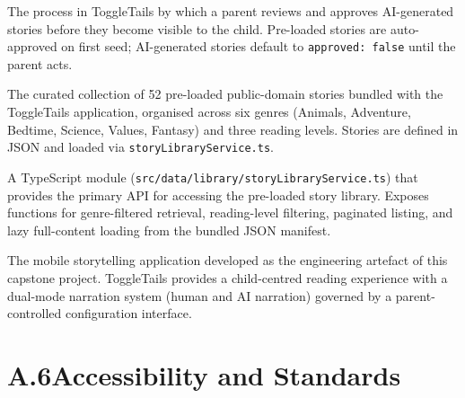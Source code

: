 \begin{description}[leftmargin=2.5cm, style=nextline]
\item[\textbf{Story Approval Workflow}]
The process in ToggleTails by which a parent reviews and approves
AI-generated stories before they become visible to the child. Pre-loaded
stories are auto-approved on first seed; AI-generated stories default to
\texttt{approved: false} until the parent acts.

\item[\textbf{Story Library}]
The curated collection of 52 pre-loaded public-domain stories bundled with
the ToggleTails application, organised across six genres (Animals, Adventure,
Bedtime, Science, Values, Fantasy) and three reading levels. Stories are
defined in JSON and loaded via \texttt{storyLibraryService.ts}.

\item[\textbf{storyLibraryService}]
A TypeScript module (\texttt{src/data/library/storyLibraryService.ts}) that
provides the primary API for accessing the pre-loaded story library. Exposes
functions for genre-filtered retrieval, reading-level filtering, paginated
listing, and lazy full-content loading from the bundled JSON manifest.

\item[\textbf{ToggleTails}]
The mobile storytelling application developed as the engineering artefact of
this capstone project. ToggleTails provides a child-centred reading experience
with a dual-mode narration system (human and AI narration) governed by a
parent-controlled configuration interface.

\end{description}

\section*{A.6\quad Accessibility and Standards}

